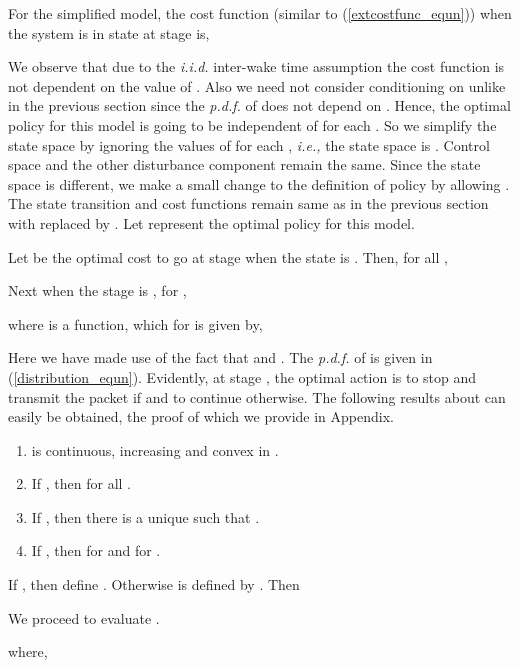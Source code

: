 \documentclass[onecolumn]{IEEEtran}
\begin{document}
For the simplified model, the cost function (similar to (\ref{extcostfunc_equn})) when the system is in state  at stage  is,

We observe that due to the \emph{i.i.d.} inter-wake time assumption the cost
function is not dependent on the value of . Also we need not
consider conditioning on  unlike in the previous section
since the \emph{p.d.f.} of  does not depend on .  Hence, the
optimal policy for this model is going to be independent of  for
each .  So we simplify the state space by ignoring the values of
 for each , \emph{i.e.,} the state space is
. Control space 
and the other disturbance component  remain the same.  Since
the state space is different, we make a small change to the definition
of policy  by allowing
.  The state
transition and cost functions remain same as in the previous section
with  replaced by . Let  represent the
optimal policy for this model.


Let  be the optimal cost to go at stage  when the state is
. Then, for all ,

Next when the stage is , for , 

where  is a function, which for  is given by, 
	
Here we have made use of the fact that
 and . The \emph{p.d.f.} of
 is given in (\ref{distribution_equn}).  Evidently, at
stage , the optimal action is to stop and transmit the packet if
 and to continue otherwise.
The following results about  can easily be obtained, the proof of which we provide in Appendix.
\begin{lemma}
  \label{lem:beta_properties}
  \begin{enumerate}
  \item  is continuous, increasing and convex in .
  \item If , then  for all .
  \item If , then there is a unique 
    such that .
  \item If , then  for
     and  for
    .
  \end{enumerate}
\hfill 
\end{lemma}
If , then define . Otherwise
 is defined by . Then

We proceed  to evaluate .

where,
\end{document}
